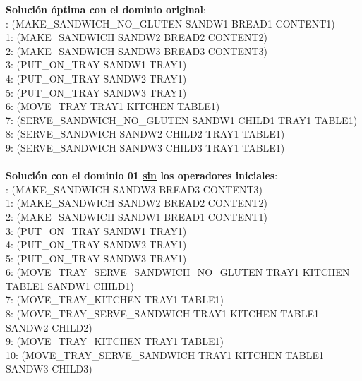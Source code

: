 \documentclass{article}
\begin{document}
\textbf{Solución óptima con el dominio original}: \\

: (MAKE\_SANDWICH\_NO\_GLUTEN SANDW1 BREAD1 CONTENT1) \\
1: (MAKE\_SANDWICH SANDW2 BREAD2 CONTENT2) \\
2: (MAKE\_SANDWICH SANDW3 BREAD3 CONTENT3) \\
3: (PUT\_ON\_TRAY SANDW1 TRAY1) \\
4: (PUT\_ON\_TRAY SANDW2 TRAY1) \\
5: (PUT\_ON\_TRAY SANDW3 TRAY1) \\
6: (MOVE\_TRAY TRAY1 KITCHEN TABLE1) \\
7: (SERVE\_SANDWICH\_NO\_GLUTEN SANDW1 CHILD1 TRAY1 TABLE1) \\
8: (SERVE\_SANDWICH SANDW2 CHILD2 TRAY1 TABLE1) \\
9: (SERVE\_SANDWICH SANDW3 CHILD3 TRAY1 TABLE1) \\

\paragraph{}
\textbf{Solución con el dominio 01 \underline{sin} los operadores iniciales}: \\
: (MAKE\_SANDWICH SANDW3 BREAD3 CONTENT3) \\
1: (MAKE\_SANDWICH SANDW2 BREAD2 CONTENT2) \\
2: (MAKE\_SANDWICH SANDW1 BREAD1 CONTENT1) \\
3: (PUT\_ON\_TRAY SANDW1 TRAY1) \\
4: (PUT\_ON\_TRAY SANDW2 TRAY1) \\
5: (PUT\_ON\_TRAY SANDW3 TRAY1) \\
6: (MOVE\_TRAY\_SERVE\_SANDWICH\_NO\_GLUTEN TRAY1 KITCHEN TABLE1 SANDW1 CHILD1) \\
7: (MOVE\_TRAY\_KITCHEN TRAY1 TABLE1) \\
8: (MOVE\_TRAY\_SERVE\_SANDWICH TRAY1 KITCHEN TABLE1 SANDW2 CHILD2) \\
9: (MOVE\_TRAY\_KITCHEN TRAY1 TABLE1) \\
10: (MOVE\_TRAY\_SERVE\_SANDWICH TRAY1 KITCHEN TABLE1 SANDW3 CHILD3) \\
\end{document}
